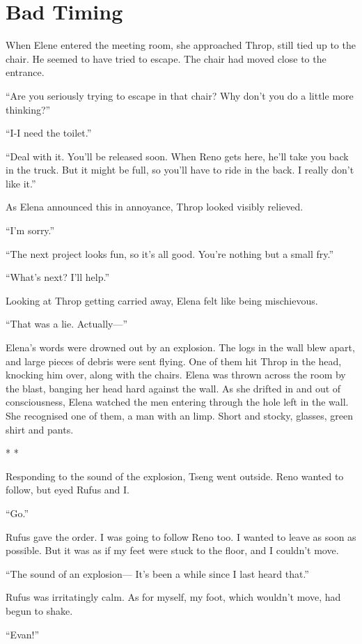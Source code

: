 \documentclass[oneside]{book}
\begin{document}
\chapter{Bad Timing}
When Elene entered the meeting room, she approached Throp, still tied up to the chair. He seemed to have tried to escape. The chair had moved close to the entrance.

“Are you seriously trying to escape in that chair? Why don’t you do a little more thinking?”

“I-I need the toilet.”

“Deal with it. You’ll be released soon. When Reno gets here, he’ll take you back in the truck. But it might be full, so you’ll have to ride in the back. I really don’t like it.”

As Elena announced this in annoyance, Throp looked visibly relieved.

“I’m sorry.”

“The next project looks fun, so it’s all good. You’re nothing but a small fry.”

“What’s next? I’ll help.”

Looking at Throp getting carried away, Elena felt like being mischievous.

“That was a lie. Actually—”

Elena’s words were drowned out by an explosion. The logs in the wall blew apart, and large pieces of debris were sent flying. One of them hit Throp in the head, knocking him over, along with the chairs. Elena was thrown across the room by the blast, banging her head hard against the wall. As she drifted in and out of consciousness, Elena watched the men entering through the hole left in the wall. She recognised one of them, a man with an limp. Short and stocky, glasses, green shirt and pants.

* *

Responding to the sound of the explosion, Tseng went outside. Reno wanted to follow, but eyed Rufus and I.

“Go.”

Rufus gave the order. I was going to follow Reno too. I wanted to leave as soon as possible. But it was as if my feet were stuck to the floor, and I couldn’t move.

“The sound of an explosion— It’s been a while since I last heard that.”

Rufus was irritatingly calm. As for myself, my foot, which wouldn’t move, had begun to shake.

“Evan!”
\end{document}
